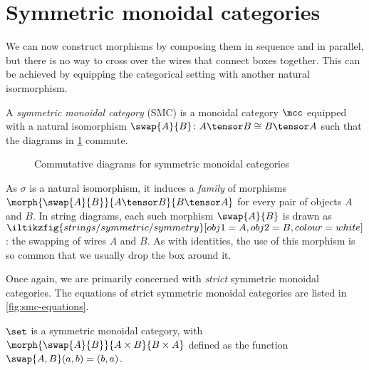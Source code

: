 \section{Symmetric monoidal categories}

We can now construct morphisms by composing them in sequence and in parallel,
but there is no way to cross over the wires that connect boxes together.
This can be achieved by equipping the categorical setting with another natural
isormorphism.

\begin{definition}
    \label{def:symmetric-monoidal-category}
    A \emph{symmetric monoidal category} (SMC) is a monoidal category \(\mcc\)
    equipped with a natural isomorphism \(
    \swap{A}{B} \colon A \tensor B \cong B \tensor A
    \) such that the diagrams in \cref{fig:smc-diagrams} commute.
\end{definition}

\begin{figure}
    \centering
    
    

    \vspace{1em}

    
    \caption{Commutative diagrams for symmetric monoidal categories}
    \label{fig:smc-diagrams}
\end{figure}

As \(\sigma\) is a natural isomorphism, it induces
a \emph{family} of morphisms \(
\morph{\swap{A}{B}}{A \tensor B}{B \tensor A}
\) for every pair of objects \(A\) and \(B\).
In string diagrams, each such morphism \(\swap{A}{B}\) is drawn as \(
\iltikzfig{strings/symmetric/symmetry}[obj1=A, obj2=B, colour=white]
\): the swapping of wires \(A\) and \(B\).
As with identities, the use of this morphism is so common that we usually
drop the box around it.

Once again, we are primarily concerned with \emph{strict} symmetric
monoidal categories.
The equations of strict symmetric monoidal categories are listed in
\cref{fig:smc-equations}.



\begin{example}
    \(\set\) is a symmetric monoidal category, with \(
    \morph{\swap{A}{B}}{A \times B}{B \times A}
    \) defined as the function \(\swap{A,B}(a, b) = (b, a)\).
\end{example}